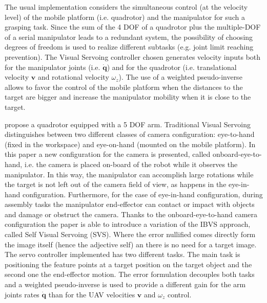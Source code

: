  
 The usual implementation considers the simultaneous control (at the velocity level) of the mobile platform (i.e. quadrotor) and the manipulator for such a grasping task. Since the sum of the 4 DOF of a quadrotor plus the multiple-DOF of a serial manipulator leads to a redundant system, the possibility of choosing degrees of freedom is used to realize different subtasks (e.g. joint limit reaching prevention). The Visual Servoing controller chosen generates velocity inputs both for the manipulator joints (i.e. $\bm{\dot{q}}$) and for the quadrotor (i.e. translational velocity $\bm{v}$ and rotational velocity $\omega_z$). The use of a weighted pseudo-inverse allows to favor the control of the mobile platform when the distances to the target are bigger and increase the manipulator mobility when it is close to the target.
 
 
 \cite{mebarki_image-based_2014} propose a quadrotor equipped with a 5 DOF arm. Traditional Visual Servoing distinguishes between two different classes of camera configuration: eye-to-hand (fixed in the workspace) and eye-on-hand (mounted on the mobile platform). In this paper a new configuration for the camera is presented, called onboard-eye-to-hand, i.e. the camera is placed on-board of the robot while it observes the manipulator. In this way, the manipulator can accomplish large rotations while the target is not left out of the camera field of view, as happens in the eye-in-hand configuration. Furthermore, for the case of eye-in-hand configuration, during assembly tasks the manipulator end-effector can contact or impact with objects and damage or obstruct the camera. Thanks to the onboard-eye-to-hand camera configuration the paper is able to introduce a variation of the IBVS approach, called Self Visual Servoing (SVS). Where the error nullified comes directly form the image itself (hence the adjective self) an there is no need for a target image. The servo controller implemented has two different tasks. The main task is positioning the feature points at a target position on the target object and the second one the end-effector motion. The error formulation decouples both tasks and a weighted pseudo-inverse is used to provide a different gain for the arm joints rates $\bm{\dot{q}}$ than for the UAV velocities $\bm{v}$ and $\omega_z$ control.
 
 

